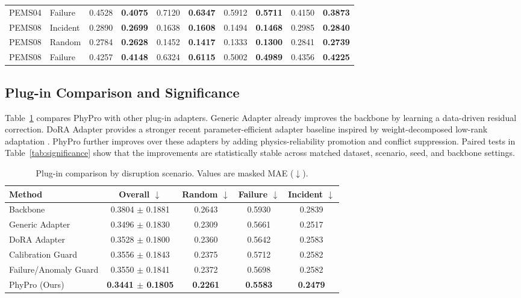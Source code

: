 \documentclass[preprint,12pt]{elsarticle}
\begin{document}
\begin{table}[!htbp]
{\begin{tabular}{@{}llcccccccc@{}}
PEMS04 & Failure & 0.4528 & \textbf{0.4075} & 0.7120 & \textbf{0.6347} & 0.5912 & \textbf{0.5711} & 0.4150 & \textbf{0.3873} \\
PEMS08 & Incident & 0.2890 & \textbf{0.2699} & 0.1638 & \textbf{0.1608} & 0.1494 & \textbf{0.1468} & 0.2985 & \textbf{0.2840} \\
PEMS08 & Random & 0.2784 & \textbf{0.2628} & 0.1452 & \textbf{0.1417} & 0.1333 & \textbf{0.1300} & 0.2841 & \textbf{0.2739} \\
PEMS08 & Failure & 0.4257 & \textbf{0.4148} & 0.6324 & \textbf{0.6115} & 0.5002 & \textbf{0.4989} & 0.4356 & \textbf{0.4225} \\
\bottomrule
\end{tabular}
}
\end{table}

\subsection{Plug-in Comparison and Significance}
Table~\ref{tab:plugin} compares PhyPro with other plug-in adapters. Generic Adapter already improves the backbone by learning a data-driven residual correction. DoRA Adapter provides a stronger recent parameter-efficient adapter baseline inspired by weight-decomposed low-rank adaptation \citep{liu2024dora}. PhyPro further improves over these adapters by adding physics-reliability promotion and conflict suppression. Paired tests in Table~\ref{tab:significance} show that the improvements are statistically stable across matched dataset, scenario, seed, and backbone settings.

\begin{table}[!htbp]
\centering
\small
\caption{Plug-in comparison by disruption scenario. Values are masked MAE ($\downarrow$).}
\label{tab:plugin}
\begin{tabular}{@{}lcccc@{}}
\toprule
Method & Overall $\downarrow$ & Random $\downarrow$ & Failure $\downarrow$ & Incident $\downarrow$ \\
\midrule
Backbone & 0.3804 $\pm$ 0.1881 & 0.2643 & 0.5930 & 0.2839 \\
Generic Adapter & 0.3496 $\pm$ 0.1830 & 0.2309 & 0.5661 & 0.2517 \\
DoRA Adapter & 0.3528 $\pm$ 0.1800 & 0.2360 & 0.5642 & 0.2583 \\
Calibration Guard & 0.3556 $\pm$ 0.1843 & 0.2375 & 0.5712 & 0.2582 \\
Failure/Anomaly Guard & 0.3550 $\pm$ 0.1841 & 0.2372 & 0.5698 & 0.2582 \\
PhyPro (Ours) & \textbf{0.3441 $\pm$ 0.1805} & \textbf{0.2261} & \textbf{0.5583} & \textbf{0.2479} \\
\bottomrule
\end{tabular}
\end{table}
\end{document}

